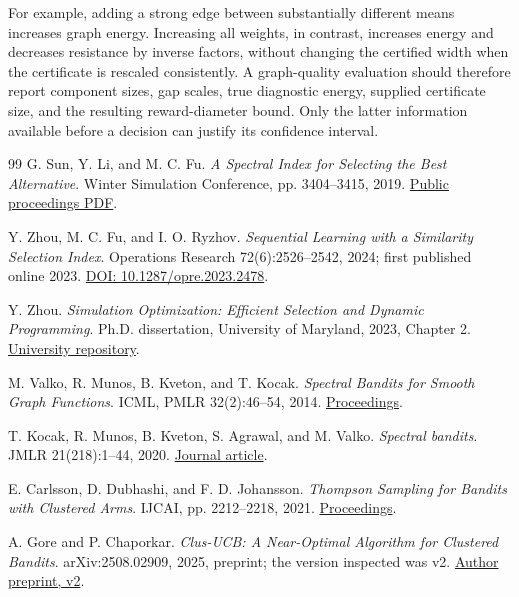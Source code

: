 \documentclass[11pt]{article}
\begin{document}
For example, adding a strong edge between substantially different means increases graph energy. Increasing all weights, in contrast, increases energy and decreases resistance by inverse factors, without changing the certified width when the certificate is rescaled consistently. A graph-quality evaluation should therefore report component sizes, gap scales, true diagnostic energy, supplied certificate size, and the resulting reward-diameter bound. Only the latter information available before a decision can justify its confidence interval.

\begin{thebibliography}{99}
 G. Sun, Y. Li, and M. C. Fu.
\emph{A Spectral Index for Selecting the Best Alternative}.
Winter Simulation Conference, pp. 3404--3415, 2019.
\href{https://www.informs-sim.org/wsc19papers/422.pdf}{Public proceedings PDF}.

 Y. Zhou, M. C. Fu, and I. O. Ryzhov.
\emph{Sequential Learning with a Similarity Selection Index}.
Operations Research 72(6):2526--2542, 2024; first published online 2023.
\href{https://pubsonline.informs.org/doi/abs/10.1287/opre.2023.2478}{DOI: 10.1287/opre.2023.2478}.

 Y. Zhou.
\emph{Simulation Optimization: Efficient Selection and Dynamic Programming}.
Ph.D. dissertation, University of Maryland, 2023, Chapter 2.
\href{https://drum.lib.umd.edu/items/b2a3657a-ca7c-4e1e-a132-af8a5e12f6f2}{University repository}.

 M. Valko, R. Munos, B. Kveton, and T. Kocak.
\emph{Spectral Bandits for Smooth Graph Functions}.
ICML, PMLR 32(2):46--54, 2014.
\href{https://proceedings.mlr.press/v32/valko14.html}{Proceedings}.

 T. Kocak, R. Munos, B. Kveton, S. Agrawal, and M. Valko.
\emph{Spectral bandits}.
JMLR 21(218):1--44, 2020.
\href{https://www.jmlr.org/papers/v21/16-529.html}{Journal article}.

 E. Carlsson, D. Dubhashi, and F. D. Johansson.
\emph{Thompson Sampling for Bandits with Clustered Arms}.
IJCAI, pp. 2212--2218, 2021.
\href{https://www.ijcai.org/proceedings/2021/305}{Proceedings}.

 A. Gore and P. Chaporkar.
\emph{Clus-UCB: A Near-Optimal Algorithm for Clustered Bandits}.
arXiv:2508.02909, 2025, preprint; the version inspected was v2.
\href{https://arxiv.org/html/2508.02909v2}{Author preprint, v2}.


\end{thebibliography}
\end{document}
